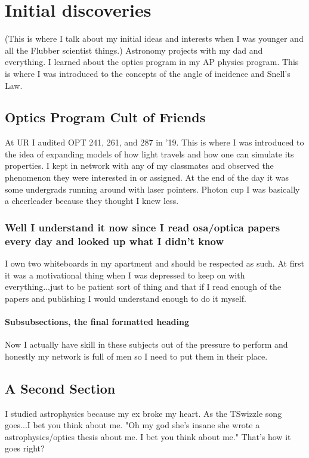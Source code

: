 \chapter{Initial discoveries}

(This is where I talk about my initial ideas and interests when I was younger and all the Flubber scientist things.) Astronomy projects with my dad and everything. 
I learned about the optics program in my AP physics program. This is where I was introduced to the concepts of the angle of incidence and Snell's Law. 

\section[Shorter Title]{Optics Program Cult of Friends}

At UR I audited OPT 241, 261, and 287 in '19. This is where I was introduced to the idea of expanding models of how light travels and how one can simulate its properties. I kept in network with any of my classmates and observed the phenomenon they were interested in or assigned. At the end of the day it was some undergrads running around with laser pointers. Photon cup I was basically a cheerleader because they thought I knew less.  

\subsection{Well I understand it now since I read osa/optica papers every day and looked up what I didn't know}

I own two whiteboards in my apartment and should be respected as such. At first it was a motivational thing when I was depressed to keep on with everything...just to be patient sort of thing and that if I read enough of the papers and publishing I would understand enough to do it myself. 

\subsubsection{Subsubsections, the final formatted heading}

Now I actually have skill in these subjects out of the pressure to perform and honestly my network is full of men so I need to put them in their place. 

\section{A Second Section}

I studied astrophysics because my ex broke my heart. As the TSwizzle song goes...I bet you think about me. "Oh my god she's insane she wrote a astrophysics/optics thesis about me. I bet you think about me." That's how it goes right?
